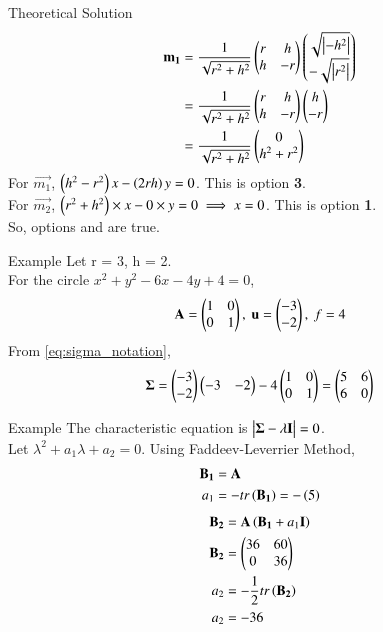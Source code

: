 \documentclass{beamer}
\begin{document}
\begin{frame}{Theoretical Solution}
\begin{align}
    \mathbf{m_1} &= \frac{1}{\sqrt{r^2+h^2}}\begin{pmatrix}r & h \\ h & -r\end{pmatrix}\begin{pmatrix}\sqrt{\left\vert-h^2\right\vert} \\ -\sqrt{\left\vert r^2\right\vert}\end{pmatrix} \\
    &= \frac{1}{\sqrt{r^2+h^2}}\begin{pmatrix}r & h \\ h & -r\end{pmatrix}\begin{pmatrix}h \\ -r\end{pmatrix} \\
    &= \frac{1}{\sqrt{r^2+h^2}}\begin{pmatrix}0 \\ h^2+r^2\end{pmatrix} \label{eq:equation2}
\end{align}
For $\vec{m_1}$, $\left(h^2-r^2\right)x - \left(2rh\right)y = 0$. This is option \textbf{3}. \\
For $\vec{m_2}$, $\left(r^2+h^2\right) \times x - 0 \times y = 0 \implies x = 0$. This is option \textbf{1}. \\
So, options \textbf{} and \textbf{} are true.
\end{frame}

\begin{frame}{Example}
Let r = 3, h = 2. \\
For the circle $x^2+y^2-6x-4y+4=0$,
\begin{align}
    \mathbf{A} = \begin{pmatrix}1 & 0 \\ 0 & 1\end{pmatrix},\text{ }\mathbf{u} = \begin{pmatrix}-3 \\ -2\end{pmatrix},\text{ }f = 4
\end{align}
From \eqref{eq:sigma_notation},
\begin{align}
    \mathbf{\Sigma} = \begin{pmatrix}-3 \\ -2\end{pmatrix}\begin{pmatrix}-3 & -2\end{pmatrix} - 4\begin{pmatrix}1 & 0 \\ 0 & 1\end{pmatrix} = \begin{pmatrix}5 & 6 \\ 6 & 0\end{pmatrix}
\end{align}
\end{frame}

\begin{frame}{Example}
The characteristic equation is $\begin{vmatrix}\mathbf{\Sigma}-\lambda\mathbf{I}\end{vmatrix}=0$. \\
Let $\lambda^2 + a_1 \lambda + a_2 = 0$. Using Faddeev-Leverrier Method,
\begin{align}
    \mathbf{B_1} &= \mathbf{A} \\
    a_1 &= - tr\left(\mathbf{B_1}\right) = -\left(5\right)
\end{align}
\begin{align}
    \mathbf{B_2} &= \mathbf{A}\left(\mathbf{B_1} + a_1\mathbf{I}\right) \\
    \mathbf{B_2} &= \begin{pmatrix}36 & 60 \\ 0 & 36\end{pmatrix} \\
    a_2 &= -\frac{1}{2}tr\left(\mathbf{B_2}\right) \\
    a_2 &= -36
\end{align}
\end{frame}
\end{document}
